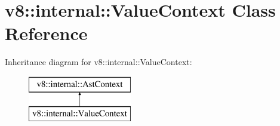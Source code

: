 \hypertarget{classv8_1_1internal_1_1_value_context}{}\section{v8\+:\+:internal\+:\+:Value\+Context Class Reference}
\label{classv8_1_1internal_1_1_value_context}
Inheritance diagram for v8\+:\+:internal\+:\+:Value\+Context\+:\begin{figure}[H]
\begin{center}
\leavevmode
\includegraphics[height=2.000000cm]{classv8_1_1internal_1_1_value_context}
\end{center}
\end{figure}
